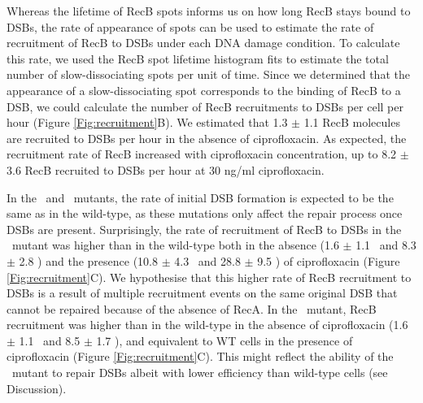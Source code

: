 Whereas the lifetime of RecB spots informs us on how long RecB stays bound to DSBs, the rate of appearance of spots can be used to estimate the rate of recruitment of RecB to DSBs under each DNA damage condition. To calculate this rate, we used the RecB spot lifetime histogram fits to estimate the total number of slow-dissociating spots per unit of time. Since we determined that the appearance of a slow-dissociating spot corresponds to the binding of RecB to a DSB, we could calculate the number of RecB recruitments to DSBs per cell per hour (Figure \ref{Fig:recruitment}B). We estimated that 1.3 $\pm$ 1.1 RecB molecules are recruited to DSBs per hour in the absence of ciprofloxacin. As expected, the recruitment rate of RecB increased with ciprofloxacin concentration, up to 8.2 $\pm$ 3.6 RecB recruited to DSBs per hour at 30 ng/ml ciprofloxacin.

In the \dreca\ and \geneteneighty\ mutants, the rate of initial DSB formation is expected to be the same as in the wild-type, as these mutations only affect the repair process once DSBs are present. Surprisingly, the rate of recruitment of RecB to DSBs in the \dreca\ mutant was higher than in the wild-type both in the absence (1.6 $\pm$ 1.1 \ph\ and 8.3 $\pm$ 2.8 \ph) and the presence (10.8 $\pm$ 4.3 \ph\ and 28.8 $\pm$ 9.5 \ph) of ciprofloxacin (Figure \ref{Fig:recruitment}C). We hypothesise that this higher rate of RecB recruitment to DSBs is a result of multiple recruitment events on the same original DSB that cannot be repaired because of the absence of RecA. In the \geneteneighty\ mutant, RecB recruitment was higher than in the wild-type in the absence of ciprofloxacin (1.6 $\pm$ 1.1 \ph\ and 8.5 $\pm$ 1.7 \ph), and equivalent to WT cells in the presence of ciprofloxacin (Figure \ref{Fig:recruitment}C). This might reflect the ability of the \geneteneighty\ mutant to repair DSBs albeit with lower efficiency than wild-type cells (see Discussion).

